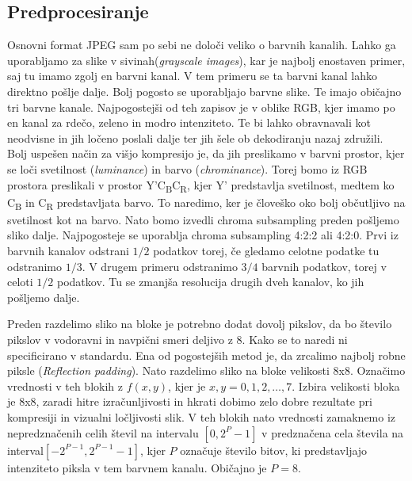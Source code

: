 \documentclass[a4paper,12pt,openright]{book}
\begin{document}
\subsection{Predprocesiranje}
Osnovni format JPEG sam po sebi ne določi veliko o barvnih kanalih. Lahko ga uporabljamo za slike v sivinah(\textit{grayscale images}), kar je najbolj enostaven primer, saj tu imamo zgolj en barvni kanal. V tem primeru se ta barvni kanal lahko direktno pošlje dalje. Bolj pogosto se uporabljajo barvne slike. Te imajo običajno tri barvne kanale. Najpogostejši od teh zapisov je v oblike RGB, kjer imamo po en kanal za rdečo, zeleno in modro intenziteto. Te bi lahko obravnavali kot neodvisne in jih ločeno poslali dalje ter jih šele ob dekodiranju nazaj združili. Bolj uspešen način za višjo kompresijo je, da jih preslikamo v barvni prostor, kjer se loči svetilnost (\textit{luminance}) in barvo (\textit{chrominance}). Torej bomo iz RGB prostora preslikali v prostor Y'C\textsubscript{B}C\textsubscript{R}, kjer Y' predstavlja svetilnost, medtem ko C\textsubscript{B} in C\textsubscript{R} predstavljata barvo. To naredimo, ker je človeško oko bolj občutljivo na svetilnost kot na barvo. Nato bomo izvedli chroma subsampling preden pošljemo sliko dalje. Najpogosteje se uporablja chroma subsampling 4:2:2 ali 4:2:0. Prvi iz barvnih kanalov odstrani $1/2$ podatkov torej, če gledamo celotne podatke tu odstranimo $1/3$. V drugem primeru odstranimo $3/4$ barvnih podatkov, torej v celoti $1/2$ podatkov. Tu se zmanjša resolucija drugih dveh kanalov, ko jih pošljemo dalje. \par

Preden razdelimo sliko na bloke je potrebno dodat dovolj pikslov, da bo število pikslov v vodoravni in navpični smeri deljivo z 8. Kako se to naredi ni specificirano v standardu. Ena od pogostejših metod je, da zrcalimo najbolj robne piksle (\textit{Reflection padding}). Nato razdelimo sliko na bloke velikosti 8x8. Označimo vrednosti v teh blokih z $f(x,y)$, kjer je $x,y = 0,1,2,\ldots,7$. Izbira velikosti bloka je 8x8, zaradi hitre izračunljivosti in hkrati dobimo zelo dobre rezultate pri kompresiji in vizualni ločljivosti slik. V teh blokih nato vrednosti zamaknemo iz nepredznačenih celih števil na intervalu $\left[0,2^P-1\right]$ v predznačena cela števila na interval$\left[-2^{P-1},2^{P-1}-1\right]$, kjer $P$ označuje število bitov, ki predstavljajo intenziteto piksla v tem barvnem kanalu. Običajno je $P=8$.
\end{document}
